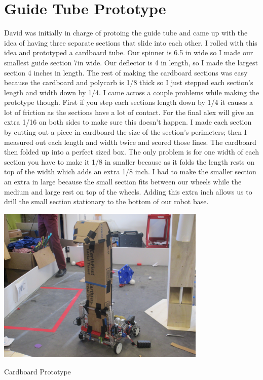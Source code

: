 \section*{Guide Tube Prototype}
David was initially in charge of protoing the guide tube and came up with the idea of having three separate sections that slide into each other. I rolled with this idea and prototyped a cardboard tube. Our spinner is 6.5 in wide so I made our smallest guide section 7in wide. Our deflector is 4 in length, so I made the largest section 4 inches in length. The rest of making the cardboard sections was easy because the cardboard and polycarb is 1/8 thick so I just stepped each section’s length and width down by 1/4. I came across a couple problems while making the prototype though. First if you step each sections length down by 1/4 it causes a lot of friction as the sections have a lot of contact. For the final alex will give an extra 1/16 on both sides to make sure this doesn’t happen. I made each section by cutting out a piece in cardboard the size of the section’s perimeters; then I measured out each length and width twice and scored those lines. The cardboard then folded up into a perfect sized box. The only problem is for one width of each section you have to make it 1/8 in smaller because as it folds the length rests on top of the width which adds an extra 1/8 inch. I had to make the smaller section an extra in large because the small section fits between our wheels while the medium and large rest on top of the wheels. Adding this extra inch allows us to drill the small section stationary to the bottom of our robot base.

\begin{center}
\includegraphics[width=10cm]{./Entries/Images/CardboardProto.JPG}
\end{center}

Cardboard Prototype

